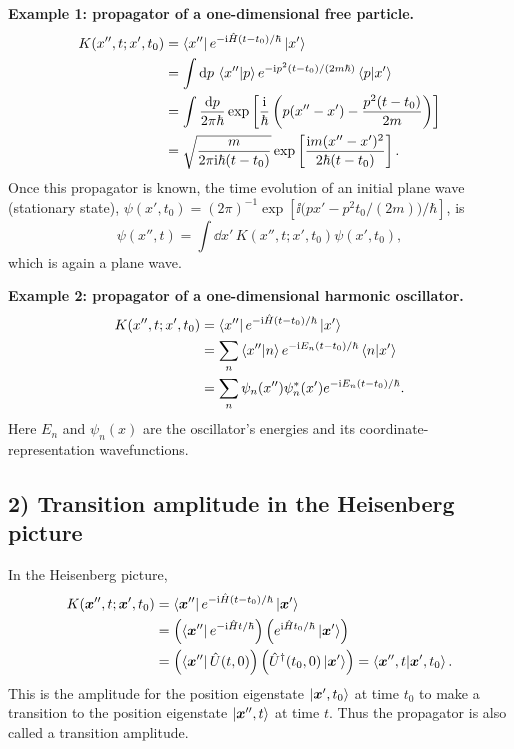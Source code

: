 \textbf{Example 1: propagator of a one-dimensional free particle.}
\begin{equation}
\begin{split}
K(x'',t;x',t_0)
&=\left\langle x''\right|e^{-\mathrm{i}\hat{H}(t-t_0)/\hbar}\left|x'\right\rangle\\
&=\int\mathrm{d} p\,\left\langle x''\middle|p\right\rangle e^{-\mathrm{i} p^2(t-t_0)/(2m\hbar)}\left\langle p\middle|x'\right\rangle\\
&=\int\frac{\mathrm{d} p}{2\pi\hbar}
\exp\left[\frac{\mathrm{i}}\hbar\left(p(x''-x')-\frac{p^2(t-t_0)}{2m}\right)\right]\\
&=\sqrt{\frac{m}{2\pi\mathrm{i}\hbar(t-t_0)}}
\exp\left[\frac{\mathrm{i} m(x''-x')^2}{2\hbar(t-t_0)}\right].
\end{split}
\end{equation}
Once this propagator is known, the time evolution of an initial plane wave (stationary state), $\psi(x',t_0)=(2\pi)^{-1}\exp\left[{\ii}\bigl(px'-p^2t_0/(2m)\bigr)/\hbar\right]$, is
\begin{equation}
\psi(x'',t)=\int\dd x'\,K(x'',t;x',t_0)\psi(x',t_0),
\end{equation}
which is again a plane wave.

\textbf{Example 2: propagator of a one-dimensional harmonic oscillator.}
\begin{equation}
\begin{split}
K(x'',t;x',t_0)
&=\left\langle x''\right|e^{-\mathrm{i}\hat{H}(t-t_0)/\hbar}\left|x'\right\rangle\\
&=\sum_n\left\langle x''\middle|n\right\rangle e^{-\mathrm{i} E_n(t-t_0)/\hbar}\left\langle n\middle|x'\right\rangle\\
&=\sum_n\psi_n(x'')\psi_n^*(x')e^{-\mathrm{i} E_n(t-t_0)/\hbar}.
\end{split}
\end{equation}
Here $E_n$ and $\psi_n(x)$ are the oscillator's energies and its coordinate-representation wavefunctions.

\subsection*{2) Transition amplitude in the Heisenberg picture}
In the Heisenberg picture,
\begin{equation}
\begin{split}
K(\bm{x}'',t;\bm{x}',t_0)
&=\left\langle\bm{x}''\right|e^{-\mathrm{i}\hat{H}(t-t_0)/\hbar}\left|\bm{x}'\right\rangle\\
&=\left(\left\langle\bm{x}''\right|e^{-\mathrm{i}\hat{H}t/\hbar}\right)
\left(e^{\mathrm{i}\hat{H}t_0/\hbar}\left|\bm{x}'\right\rangle\right)\\
&=\left(\left\langle\bm{x}''\right|\hat{U}(t,0)\right)
\left(\hat{U}^{\dagger}(t_0,0)\left|\bm{x}'\right\rangle\right)
=\left\langle\bm{x}'',t\middle|\bm{x}',t_0\right\rangle.
\end{split}
\end{equation}
This is the amplitude for the position eigenstate $\left|\bm{x}',t_0\right\rangle$ at time $t_0$ to make a transition to the position eigenstate $\left|\bm{x}'',t\right\rangle$ at time $t$. Thus the propagator is also called a transition amplitude.

